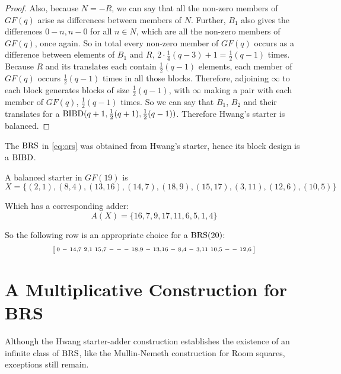 \begin{proof}
Also, because $N = -R$, we can say that all the non-zero members of $GF(q)$ arise as differences between members of $N$.
Further, $B_1$ also gives the differences $0 - n, n - 0$ for all $n\in N$, which are all the non-zero members of $GF(q)$, once again.
So in total every non-zero member of $GF(q)$ occurs as a difference between elements of $B_1$ and $R$, $2 \cdot \frac{1}{4}(q - 3) + 1 = \frac{1}{2} (q - 1)$ times.
Because $R$ and its translates each contain $\frac{1}{2}(q - 1)$ elements, each member of $GF(q)$ occurs $\frac{1}{2}(q - 1)$ times in all those blocks.
Therefore, adjoining $\infty$ to each block generates blocks of size $\frac{1}{2}(q - 1)$, with $\infty$ making a pair with each member of $GF(q)$, $\frac{1}{2}(q - 1)$ times.
So we can say that $B_1$, $B_2$ and their translates for a $\operatorname{BIBD}(q  +1, \frac{1}{2}(q + 1), \frac{1}{2}(q - 1))$.
Therefore Hwang’s starter is balanced. 
\end{proof}

The $\operatorname{BRS}$ in \eqref{eq:ors} was obtained from Hwang’s starter, hence its block design is a $\operatorname{BIBD}$.

\begin{example}
A balanced starter in $GF(19)$ is
\begin{equation}
X = \{(2,1),(8,4),(13,16),(14,7),(18,9),(15,17),(3,11),(12,6),(10,5)\}
\end{equation}

Which has a corresponding adder:
\begin{equation}
A(X) = \{16,7,9,17,11,6,5,1,4\}
\end{equation}

So the following row is an appropriate choice for a $\operatorname{BRS}(20)$:
\begin{equation}
 \begin{bsmallmatrix}
   0 & - & 14,7 & 2,1 & 15,7 & - & - & - & 18,9 & - & 13,16 & - & 8,4 & - & 3,11 & 10,5 & - & - & 12,6
 \end{bsmallmatrix}
\end{equation}

\end{example}

\section{A Multiplicative Construction for BRS}

Although the Hwang starter-adder construction establishes the existence of an infinite class of $\operatorname{BRS}$, like the Mullin-Nemeth construction for Room squares, exceptions still remain.

